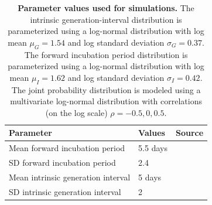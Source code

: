 \documentclass[12pt]{article}
\begin{document}
\begin{table}[!th]
\begin{center}
\begin{tabular}{|l|l|r|}
\hline
Parameter & Values & Source\\
\hline
Mean forward incubation period & 5.5 days & \cite{lauer2020incubation} \\
SD forward incubation period & 2.4 & \cite{lauer2020incubation} \\
Mean intrinsic generation interval & 5 days & \cite{ferretti2020quantifying} \\
SD intrinsic generation interval & 2 & \cite{ferretti2020quantifying} \\
\hline
\end{tabular}
\end{center}
\caption{
\textbf{Parameter values used for simulations.}
The intrinsic generation-interval distribution is parameterized using a log-normal distribution with log mean $\mu_G=1.54$ and log standard deviation $\sigma_G=0.37$.
The forward incubation period distribution is parameterized using a log-normal distribution with log mean $\mu_I=1.62$ and log standard deviation $\sigma_I=0.42$.
The joint probability distribution is modeled using a multivariate log-normal distribution with correlations (on the log scale) $\rho=-0.5, 0, 0.5$.
}
\end{table}
\end{document}
